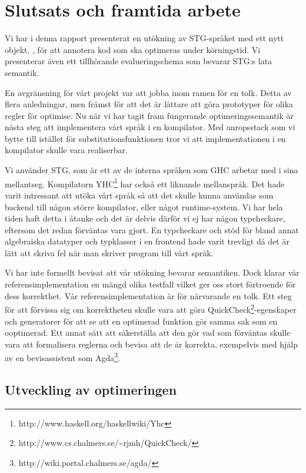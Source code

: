 \documentclass[Rapport]{subfiles}
\begin{document}
\chapter{Slutsats och framtida arbete}

Vi har i denna rapport presenterat en utökning av STG-språket med ett nytt objekt, , för att annotera kod som ska optimeras under körningstid. Vi presenterar även ett tillhörande evalueringschema som bevarar STG:s lata semantik. 

En avgränsning för vårt projekt var att jobba inom ramen för en tolk. 
Detta av flera anledningar, men främst för att det är lättare att göra prototyper för 
olika regler för optimise. Nu när vi har tagit fram fungerande optimeringssemantik 
är nästa steg att implementera vårt språk i en kompilator.
Med anropsstack som vi bytte till istället för substitutionsfunktionen tror vi att implementationen
i en kompilator skulle vara realiserbar.


Vi använder STG, som är ett av de interna språken som GHC arbetar med i sina
mellantseg. Kompilatorn YHC\footnote{http://www.haskell.org/haskellwiki/Yhc} 
har också ett liknande mellanspråk.
Det hade varit intressant att utöka vårt språk så att det skulle kunna 
användas som backend till någon större kompilator, eller något runtime-system.
Vi har hela tiden haft detta i åtanke och det är delvis därför vi ej har någon 
typcheckare, eftersom det redan förväntas vara gjort.
En typcheckare och stöd för bland annat algebraiska datatyper och typklasser i en 
frontend hade varit trevligt då det är lätt att skriva fel när man skriver
program till vårt språk. 


Vi har inte formellt bevisat att vår utökning bevarar semantiken. Dock klarar vår referensimplementation en mängd olika testfall vilket ger oss stort förtroende för dess korrekthet. Vår referensimplementation är för närvarande en tolk. 
Ett steg för att förvissa sig om korrektheten skulle vara att göra 
QuickCheck\footnote{http://www.cs.chalmers.se/\textasciitilde rjmh/QuickCheck/}-egenskaper 
och generatorer för att se att en optimerad funktion gör samma sak som en ooptimerad. 
Ett annat sätt att säkerställa att den
gör vad som förväntas skulle vara att formalisera reglerna och bevisa
att de är korrekta, exempelvis med hjälp av en bevisassistent som 
Agda\footnote{http://wiki.portal.chalmers.se/agda/}.

\section{Utveckling av optimeringen}
\end{document}
